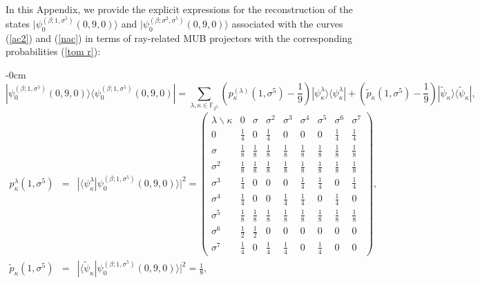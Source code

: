 \documentclass[quantumrep,article,accept,pdftex,moreauthors]{Definitions/mdpi}
\begin{document}
In this Appendix, we provide the explicit expressions for the reconstruction of
the states $|\psi_{0}^{(\beta;1,\sigma^{5})}(0,9,0)\rangle$ and
$|\psi_{0}^{(\beta ;\sigma^{2},\sigma^{5})}(0,9,0)\rangle$ associated with the
curves (\ref{ac2}) and (\ref{nac}) in terms of ray-related MUB projectors with
the corresponding probabilities (\ref{tom r}):
\begin{adjustwidth}{-\extralength}{0cm}
\begin{equation}
  |\psi _{0}^{(\beta ;1, \sigma^{5})}(0,9,0)\rangle
  \langle \psi_{0}^{(\beta;1,\sigma^{5})}(0,9,0)|
  = \sum_{\lambda ,\kappa \in \mathbb{F}_{2^{3}}}
  \left( p_{\kappa }^{(\lambda )}(1,\sigma ^{5})-\frac{1}{9}\right)
  |\psi_{\kappa}^{\lambda }\rangle \langle \psi_{\kappa }^{\lambda }|
  + \left( \tilde{p}_{\kappa }(1,\sigma ^{5})-\frac{1}{9}\right)
  |\tilde{\psi}_{\kappa }\rangle \langle \tilde{\psi}_{\kappa }|,
  \label{ac recon}
\end{equation}
\begin{eqnarray}
  p_{\kappa}^{\lambda}(1,\sigma^{5})
  &=& |\langle \psi_{\kappa }^{\lambda}
  |\psi_{0}^{(\beta ;1,\sigma ^{5})}(0,9,0)\rangle|^{2}
  = \left(\begin{array}{ccccccccc} \lambda \backslash \kappa  & 0 & \sigma  &
      \sigma ^{2} & \sigma ^{3} & \sigma^{4} & \sigma ^{5} & \sigma ^{6} &
      \sigma ^{7} \\ 
    0 & \frac{1}{4} & 0 & \frac{1}{4} & 0 & 0 & 0 & \frac{1}{4} & \frac{1}{4} \\
    [6pt]
    \sigma & \frac{1}{8} & \frac{1}{8} & \frac{1}{8} & \frac{1}{8} & \frac{1}{8}
           & \frac{1}{8} & \frac{1}{8} & \frac{1}{8} \\ [6pt]
    \sigma^{2} & \frac{1}{8} & \frac{1}{8} & \frac{1}{8} & \frac{1}{8} &
    \frac{1}{8} & \frac{1}{8} & \frac{1}{8} & \frac{1}{8} \\  [6pt]
    \sigma^{3} & \frac{1}{4} & 0 & 0 & 0 & \frac{1}{4} & \frac{1}{4} & 0 &
    \frac{1}{4} \\  [6pt] \sigma^{4} & \frac{1}{4} & 0 & 0 & \frac{1}{4} &
    \frac{1}{4} & 0 & \frac{1}{4} & 0 \\  [6pt]
    \sigma^{5} & \frac{1}{8} & \frac{1}{8} & \frac{1}{8} & \frac{1}{8} &
    \frac{1}{8} & \frac{1}{8} & \frac{1}{8} & \frac{1}{8} \\  [6pt] \sigma^{6} &
    \frac{1}{2} & \frac{1}{2} & 0 & 0 & 0 & 0 & 0 & 0 \\  [6pt]
    \sigma^{7} & \frac{1}{4} & 0 & \frac{1}{4} & \frac{1}{4} & 0 & \frac{1}{4} &
    0 & 0
  \end{array}\right), \\
  \tilde{p}_{\kappa }(1,\sigma^{5})
  &=& |\langle \tilde\psi_\kappa | \psi_0^{(\beta;1,\sigma^5)}(0,9,0)\rangle|^2
  = \frac{1}{8},%
\end{eqnarray}
\end{adjustwidth}
\end{document}
